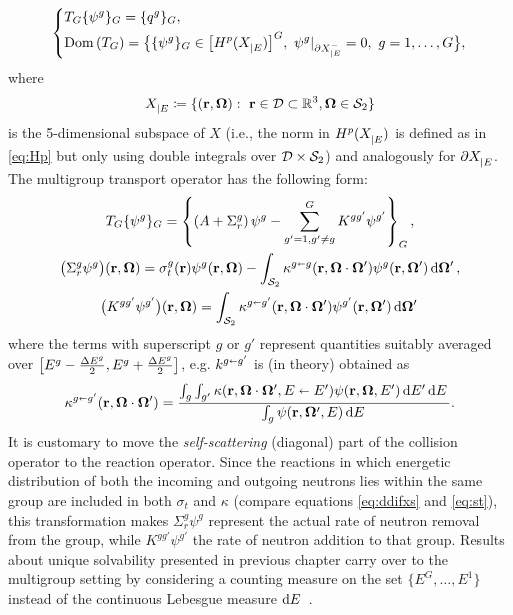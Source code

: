 \begin{equation}\label{eq:mg}
	\left\{
	  \begin{aligned}
      &T_G\{\psi^g\}_G = \{q^g\}_G,\\
      &\Dom{T_G} = \bigl\{\{\psi^g\}_G\in \bigl[\Hp(\XE)\bigr]^G,\ \psi^g\vert_{\pXE[-]} = 0,\ g = 1,\ldots,G\bigr\},
    \end{aligned}
  \right.\\[.2em]
\end{equation}
where
$$
	\XE \coloneqq \{(\br,\bomega):\ \br\in \VV\subset\R[3], \bomega\in \Sphere\}
$$
is the 5-dimensional subspace of $X$ (i.e., the norm in $\Hp(\XE)$ is defined as
in \eqref{eq:Hp} but only using double integrals over $\VV\times\Sphere$) and analogously for $\pXE$.
The multigroup transport operator has the following form:
\begin{equation*}
\begin{gathered}
    T_G\{\psi^g\}_G = \left\{\left(A + \Sigma_r^g\right)\psi^g - \summ{g'=1,g'\neq g}{G}
    K^{gg'}\psi^{g'}\right\}_G,\\
    \bigl(\Sigma_r^g\psi^g\bigr)(\br,\bomega) = \sigma_t^g(\br)\psi^g(\br,\bomega) - \intA[']{\kappa^{g\sla
    g}(\br,\bomega\cdot\bomega')\psi^g(\br,\bomega')},\\ \bigl(K^{gg'}\psi^{g'}\bigr)(\br,\bomega) =
    \intA[']{\kappa^{g\sla g'}(\br,\bomega\cdot\bomega')\psi^{g'}(\br,\bomega')}
\end{gathered}
\end{equation*}
where the terms with superscript $g$ or $g'$ represent quantities suitably averaged over 
\mbox{$\bigl[E^{g}-\dEh{g}, E^{g}+\dEh{g}\bigr]$}, e.g. $k^{g\sla g'}$ is (in theory) obtained as
\begin{equation}\label{eq:mg-kappa}
	\kappa^{g\sla g'}(\br,\bomega\cdot\bomega') = \frac{\int_{g}\int_{g'} \kappa(\br,\bomega\cdot\bomega',E \sla
	E')\psi(\br,\bomega,E')\,\d{E'}\d{E}}{\int_{g}\psi(\br, \bomega', E)\,\d{E}}.
\end{equation}
It is customary to move the \textit{self-scattering} (diagonal) part of the
collision operator to the reaction operator. Since the reactions in which energetic distribution of both the incoming 
and outgoing neutrons lies within the same group are included in both $\sigma_t$ and $\kappa$  (compare equations
\eqref{eq:ddifxs} and \eqref{eq:st}), this transformation makes $\Sigma_r^g\psi^g$ represent the actual rate of neutron
removal from the group, while $K^{gg'}\psi^{g'}$ the rate of neutron addition to that group. Results about unique
solvability presented in previous chapter carry over to the multigroup setting by considering a counting measure on the
set $\{E^G,\ldots,E^1\}$ instead of the continuous Lebesgue measure $\d{E}$ \cite[Chap. XXI \S 2]{DautrayLions}.

